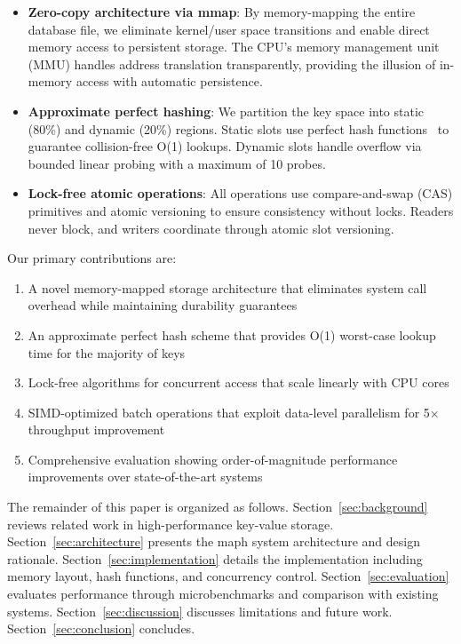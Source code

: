 \documentclass[10pt,conference]{IEEEtran}
\begin{document}
\begin{itemize}
\item \textbf{Zero-copy architecture via mmap}: By memory-mapping the entire database file, we eliminate kernel/user space transitions and enable direct memory access to persistent storage. The CPU's memory management unit (MMU) handles address translation transparently, providing the illusion of in-memory access with automatic persistence.

\item \textbf{Approximate perfect hashing}: We partition the key space into static (80\%) and dynamic (20\%) regions. Static slots use perfect hash functions~\cite{chd-algorithm,bbhash} to guarantee collision-free O(1) lookups. Dynamic slots handle overflow via bounded linear probing with a maximum of 10 probes.

\item \textbf{Lock-free atomic operations}: All operations use compare-and-swap (CAS) primitives and atomic versioning to ensure consistency without locks. Readers never block, and writers coordinate through atomic slot versioning.
\end{itemize}

Our primary contributions are:

\begin{enumerate}
\item A novel memory-mapped storage architecture that eliminates system call overhead while maintaining durability guarantees
\item An approximate perfect hash scheme that provides O(1) worst-case lookup time for the majority of keys
\item Lock-free algorithms for concurrent access that scale linearly with CPU cores
\item SIMD-optimized batch operations that exploit data-level parallelism for 5× throughput improvement
\item Comprehensive evaluation showing order-of-magnitude performance improvements over state-of-the-art systems
\end{enumerate}

The remainder of this paper is organized as follows. Section~\ref{sec:background} reviews related work in high-performance key-value storage. Section~\ref{sec:architecture} presents the maph system architecture and design rationale. Section~\ref{sec:implementation} details the implementation including memory layout, hash functions, and concurrency control. Section~\ref{sec:evaluation} evaluates performance through microbenchmarks and comparison with existing systems. Section~\ref{sec:discussion} discusses limitations and future work. Section~\ref{sec:conclusion} concludes.
\end{document}
